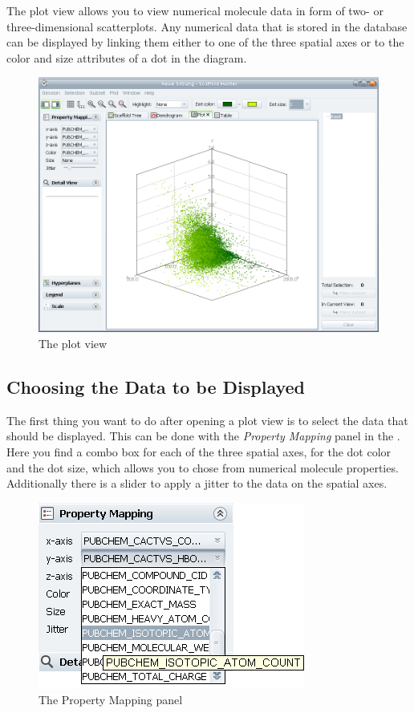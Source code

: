 The plot view allows you to view numerical molecule data in form of
two- or three-dimensional scatterplots. Any numerical data that is
stored in the database can be displayed by linking them either to
one of the three spatial axes or to the color and size attributes
of a dot in the diagram.

%
\begin{figure}[!htb]
\begin{centering}
\includegraphics[width=0.8\columnwidth]{images/plot/plot_overview}
\par\end{centering}

\caption{The plot view}


%
\end{figure}



\subsection{Choosing the Data to be Displayed}

The first thing you want to do after opening a plot view is to select
the data that should be displayed. This can be done with the \textit{Property
Mapping} panel in the \sbar. Here you find a combo box for each of
the three spatial axes, for the dot color and the dot size, which allows
you to chose from numerical molecule properties. Additionally there is a slider
to apply a jitter to the data on the spatial axes.

%
\begin{figure}[!htb]
\begin{centering}
\includegraphics[width=0.3\columnwidth]{images/plot/property_mapping}
\par\end{centering}

\caption{The Property Mapping panel}
%
\end{figure}


